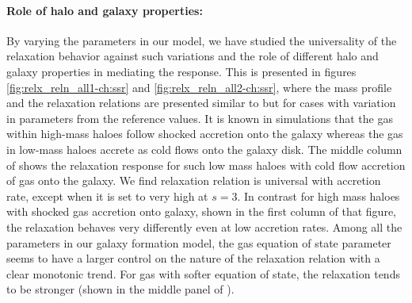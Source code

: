 \paragraph{Role of halo and galaxy properties:}
By varying the parameters in our model, we have studied the universality of the relaxation behavior against such variations and the role of different halo and galaxy properties in mediating the response. This is presented in figures \ref{fig:relx_reln_all1-ch:ssr} and \ref{fig:relx_reln_all2-ch:ssr}, where the mass profile and the relaxation relations are presented similar to  but for cases with variation in parameters from the reference values. It is known in simulations that the gas within high-mass haloes follow shocked accretion onto the galaxy whereas the gas in low-mass haloes accrete as cold flows onto the galaxy disk. The middle column of  shows the relaxation response for such low mass haloes with cold flow accretion of gas onto the galaxy. We find relaxation relation is universal with accretion rate, except when it is set to very high at $s=3$. In contrast for high mass haloes with shocked gas accretion onto galaxy, shown in the first column of that figure, the relaxation behaves very differently even at low accretion rates. Among all the parameters in our galaxy formation model, the gas equation of state parameter seems to have a larger control on the nature of the relaxation relation with a clear monotonic trend. For gas with softer equation of state, the relaxation tends to be stronger (shown in the middle panel of ). 

